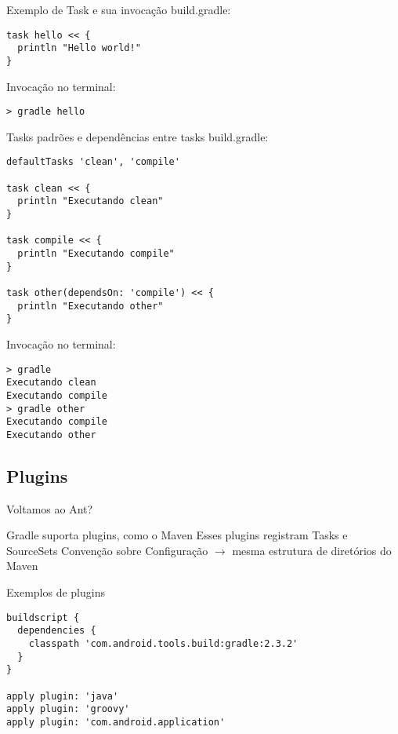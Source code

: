 \documentclass{beamer}
\begin{document}
\begin{frame}[fragile]{Exemplo de Task e sua invocação}
 build.gradle:
 \begin{verbatim}
task hello << {
  println "Hello world!"
}
 \end{verbatim}
 Invocação no terminal:
 \begin{verbatim}
> gradle hello
 \end{verbatim}
\end{frame}

\begin{frame}[fragile]{Tasks padrões e dependências entre tasks}
 build.gradle:
 \begin{verbatim}
defaultTasks 'clean', 'compile'

task clean << {
  println "Executando clean"
}

task compile << {
  println "Executando compile"
}

task other(dependsOn: 'compile') << {
  println "Executando other"
}
 \end{verbatim}
 Invocação no terminal:
 \begin{verbatim}
> gradle
Executando clean
Executando compile
> gradle other
Executando compile
Executando other
 \end{verbatim}
\end{frame}

\subsection{Plugins}

\begin{frame}{Voltamos ao Ant?}
 \begin{outline}
    Gradle suporta plugins, como o Maven
    Esses plugins registram Tasks e SourceSets
    Convenção sobre Configuração $\rightarrow$ mesma estrutura de diretórios do Maven
 \end{outline}
\end{frame}

\begin{frame}[fragile]{Exemplos de plugins}
 \begin{verbatim}
buildscript {
  dependencies {
    classpath 'com.android.tools.build:gradle:2.3.2'
  }
}
 
apply plugin: 'java'
apply plugin: 'groovy'
apply plugin: 'com.android.application'
 \end{verbatim}
\end{frame}
\end{document}
